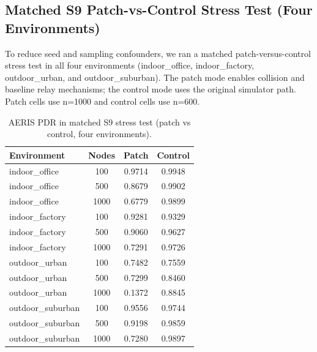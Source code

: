 \documentclass[sensors,article,submit,moreauthors,pdftex]{Definitions/mdpi}
\begin{document}
\subsection{Matched S9 Patch-vs-Control Stress Test (Four Environments)}
To reduce seed and sampling confounders, we ran a matched patch-versus-control stress test in all four environments (indoor\_office, indoor\_factory, outdoor\_urban, and outdoor\_suburban). The patch mode enables collision and baseline relay mechanisms; the control mode uses the original simulator path. Patch cells use n=1000 and control cells use n=600.

\begin{table}[H]
\caption{AERIS PDR in matched S9 stress test (patch vs control, four environments).}
\label{tab:s9_patch_control}
\centering
\begin{tabular}{lccc}
\toprule
Environment & Nodes & Patch & Control \\
\midrule
indoor\_office & 100  & 0.9714 & 0.9948 \\
indoor\_office & 500  & 0.8679 & 0.9902 \\
indoor\_office & 1000 & 0.6779 & 0.9899 \\
indoor\_factory & 100  & 0.9281 & 0.9329 \\
indoor\_factory & 500  & 0.9060 & 0.9627 \\
indoor\_factory & 1000 & 0.7291 & 0.9726 \\
outdoor\_urban & 100  & 0.7482 & 0.7559 \\
outdoor\_urban & 500  & 0.7299 & 0.8460 \\
outdoor\_urban & 1000 & 0.1372 & 0.8845 \\
outdoor\_suburban & 100  & 0.9556 & 0.9744 \\
outdoor\_suburban & 500  & 0.9198 & 0.9859 \\
outdoor\_suburban & 1000 & 0.7280 & 0.9897 \\
\bottomrule
\end{tabular}
\end{table}
\end{document}

